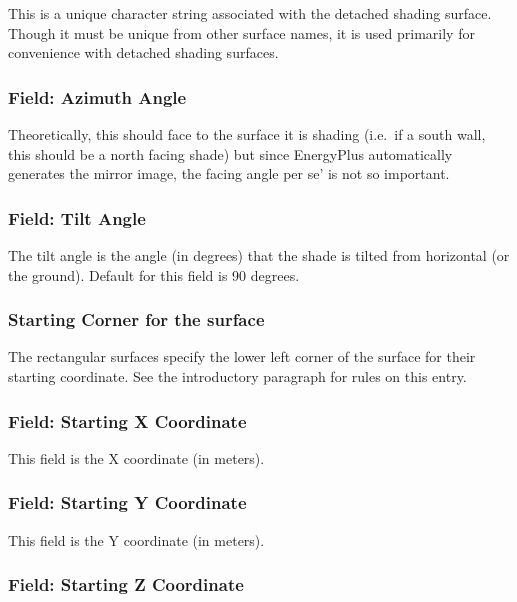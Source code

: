 This is a unique character string associated with the detached shading surface. Though it must be unique from other surface names, it is used primarily for convenience with detached shading surfaces.

\subsubsection{Field: Azimuth Angle}\label{field-azimuth-angle-10}

Theoretically, this should face to the surface it is shading (i.e.~if a south wall, this should be a north facing shade) but since EnergyPlus automatically generates the mirror image, the facing angle per se' is not so important.

\subsubsection{Field: Tilt Angle}\label{field-tilt-angle-10}

The tilt angle is the angle (in degrees) that the shade is tilted from horizontal (or the ground). Default for this field is 90 degrees.

\subsubsection{Starting Corner for the surface}\label{starting-corner-for-the-surface-16}

The rectangular surfaces specify the lower left corner of the surface for their starting coordinate. See the introductory paragraph for rules on this entry.

\subsubsection{Field: Starting X Coordinate}\label{field-starting-x-coordinate-16}

This field is the X coordinate (in meters).

\subsubsection{Field: Starting Y Coordinate}\label{field-starting-y-coordinate-10}

This field is the Y coordinate (in meters).

\subsubsection{Field: Starting Z Coordinate}\label{field-starting-z-coordinate-16}

